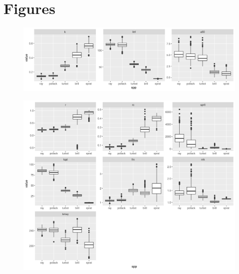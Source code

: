 \documentclass[preprint,12pt]{elsarticle}
\begin{document}

 

\section{Figures}

\begin{figure}[]\centering\includegraphics[width=5in]{rg-lhpar-1.png}\caption{}\label{fig:lh}\end{figure}
\begin{figure}[]\centering\includegraphics[width=5in]{rg-derived-1.png}\caption{}\label{fig:lh}\end{figure}
\end{document}
